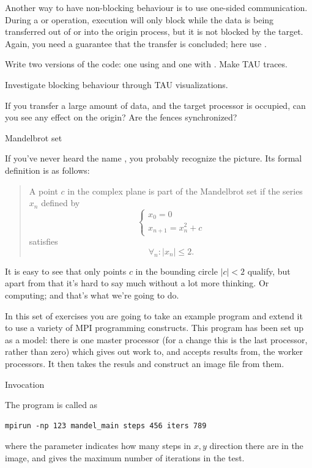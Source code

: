 Another way to have non-blocking behaviour is to use one-sided
communication.  During a  or  operation, execution will
only block while the data is being transferred out of or into the
origin process, but it is not blocked by the target. Again, you need a
guarantee that the transfer is concluded; here use
.

\begin{exercise}
  Write two versions of the code: one using  and one with .
  Make TAU traces.
\end{exercise}
Investigate blocking behaviour through TAU visualizations. 
\begin{exercise}
  If you transfer a large amount of data, and the target processor is
  occupied, can you see any effect on the origin? Are the fences
  synchronized?
\end{exercise}

 {Mandelbrot set}

If you've never heard the name , you
probably recognize the picture. Its formal definition is as follows:
\begin{quotation}\noindent
  A point $c$ in the complex plane is part of the Mandelbrot set if 
  the series $x_n$ defined by 
  \[ 
  \begin{cases}
    x_0=0\\ x_{n+1}=x_n^2+c
  \end{cases}
  \] satisfies \[ \forall_n\colon |x_n|\leq 2. \]  
\end{quotation}
It is easy to see that only points $c$ in the bounding circle
$|c|< 2$ qualify, but
apart from that it's hard to say much without a lot more thinking.
Or computing; and that's what we're going to do.

In this set of exercises you are going to take an example program
 and extend it to use a variety of MPI programming
constructs.  This program has been set up as a
 model: there is one master processor (for a
change this is the last processor, rather than zero) which gives out
work to, and accepts results from, the worker processors. It then
takes the resuls and construct an image file from them.

 {Invocation}

The  program is called as
\begin{verbatim}
mpirun -np 123 mandel_main steps 456 iters 789
\end{verbatim}
where the  parameter indicates how many steps in $x,y$
direction there are in the image, and  gives the maximum
number of iterations in the  test.

